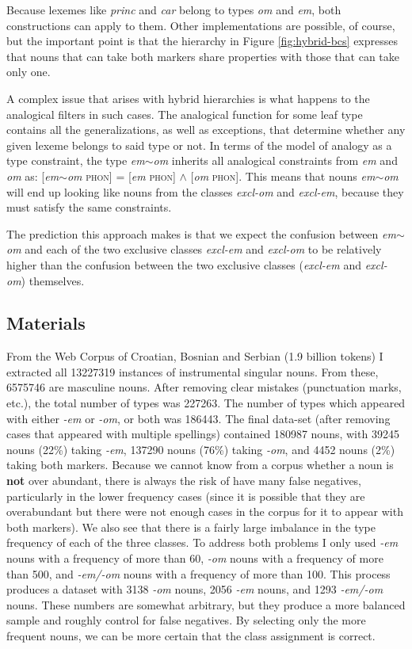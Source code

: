 Because lexemes like \textit{princ} and \textit{car} belong to types \textit{om} and \textit{em}, both constructions can apply to them. Other implementations are possible, of course, but the important point is that the hierarchy in Figure \ref{fig:hybrid-bcs} expresses that nouns that can take both markers share properties with those that can take only one.

A complex issue that arises with hybrid hierarchies is what happens to the analogical filters in such cases. The analogical function for some leaf type contains all the generalizations, as well as exceptions, that determine whether any given lexeme belongs to said type or not. In terms of the model of analogy as a type constraint, the type \textit{em$\sim$om} inherits all analogical constraints from \textit{em} and \textit{om} as: [\textit{em$\sim$om} \textsc{phon}] = [\textit{em} \textsc{phon}] $\land$ [\textit{om} \textsc{phon}]. This means that nouns \textit{em$\sim$om} will end up looking like nouns from the classes \textit{excl-om} and \textit{excl-em}, because they must satisfy the same constraints.

The prediction this approach makes is that we expect the confusion between \textit{em$\sim$om} and each of the two exclusive classes \textit{excl-em} and \textit{excl-om} to be relatively higher than the confusion between the two exclusive classes (\textit{excl-em} and \textit{excl-om}) themselves.

\subsection{Materials}

From the Web Corpus of Croatian, Bosnian and Serbian \autocite{ljubesic14-bs} (1.9 billion tokens) I extracted all 13227319 instances of instrumental singular nouns. From these, 6575746 are masculine nouns. After removing clear mistakes (punctuation marks, etc.), the total  number of types was 227263. The number of types which appeared with either \textit{-em} or \textit{-om}, or both was 186443. The final data-set (after removing cases that appeared with multiple spellings) contained 180987 nouns, with 39245 nouns (22\%) taking \textit{-em}, 137290 nouns (76\%) taking \textit{-om}, and 4452 nouns (2\%) taking both markers. Because we cannot know from a corpus whether a noun is \textbf{not} over abundant, there is always the risk of have many false negatives, particularly in the lower frequency cases (since it is possible that they are overabundant but there were not enough cases in the corpus for it to appear with both markers). We also see that there is a fairly large imbalance in the type frequency of each of the three classes. To address both problems I only used \textit{-em} nouns with a frequency of more than 60, \textit{-om} nouns with a frequency of more than 500, and \textit{-em/-om} nouns with a frequency of more than 100. This process produces a dataset with 3138 \textit{-om} nouns, 2056 \textit{-em} nouns, and 1293 \textit{-em/-om} nouns. These numbers are somewhat arbitrary, but they produce a more balanced sample and roughly control for false negatives. By selecting only the more frequent nouns, we can be more certain that the class assignment is correct.

